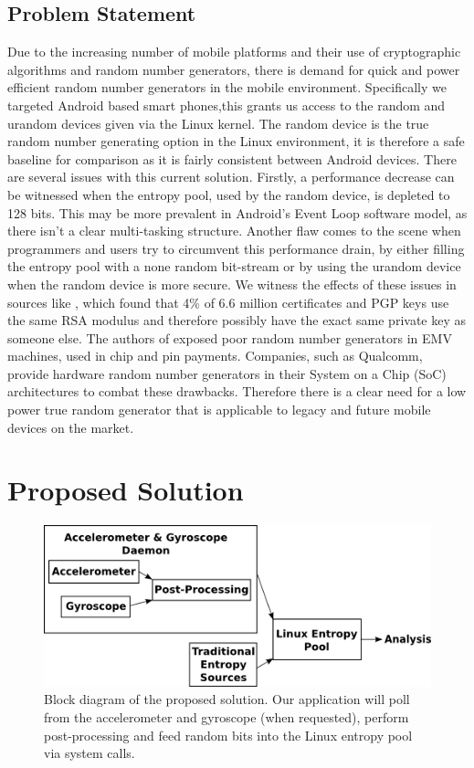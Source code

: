 \documentclass[conference]{IEEEtran}
\begin{document}
\subsection{Problem Statement}
Due to the increasing number of mobile platforms and their use of cryptographic algorithms and random number generators, there is demand for quick 
and power efficient random number generators in the mobile environment. Specifically we targeted Android based smart phones,this grants us 
access to the random and urandom devices given via the Linux kernel. The random device is the true random number generating option in the Linux 
environment, it is therefore a safe baseline for comparison as it is fairly consistent between Android devices. There are several issues with this current solution.
Firstly, a performance decrease can be witnessed when the entropy pool, used by the random device, is depleted to 128 bits. This may be more prevalent in Android's
Event Loop software model, as there isn't a clear multi-tasking structure. Another flaw comes to the scene when programmers and users try to circumvent
this performance drain, by either filling the entropy pool with a none random bit-stream or by using the urandom device when the random device is more secure.
We witness the effects of these issues in sources like \cite{ron_was_wrong}, which found that 4\% of 6.6 million certificates and PGP keys use the same RSA 
modulus and therefore possibly have the exact same private key as someone else. The authors of \cite{chip_and_skim} exposed poor random number generators
in EMV machines, used in chip and pin payments. Companies, such as Qualcomm, provide hardware random number generators in their System on a Chip (SoC) architectures to combat these drawbacks. 
Therefore there is a clear need for a low power true random generator that is applicable to legacy and future mobile devices on the market.

\section{Proposed Solution}
\begin{figure}[t]
	\includegraphics[width=\columnwidth]{proposed_solution}
	\caption{Block diagram of the proposed solution.  Our application will poll from the accelerometer and gyroscope (when requested), perform post-processing and feed random bits into the Linux entropy pool via system calls.}
	\label{proposed_solution_block}
\end{figure}
\end{document}
